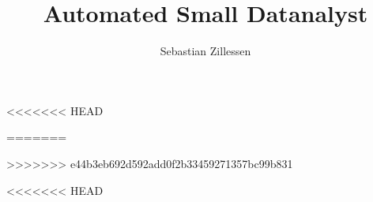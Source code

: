 \documentclass[isdraft]{kclthesis}  %
\title{Automated Small Datanalyst}
\author{Sebastian Zillessen}
\newcommand\wordcountsum{}
\begin{document}

\maketitle 		%
\maketitleTwo 	%

\newpage
\thispagestyle{empty}
\mbox{}
\newpage







\setcounter{tocdepth}{4}
\tableofcontents
\newpage





\wordcountsum











%


<<<<<<< HEAD




=======


%




>>>>>>> e44b3eb692d592add0f2b33459271357bc99b831

<<<<<<< HEAD
\appendix


\end{document}
